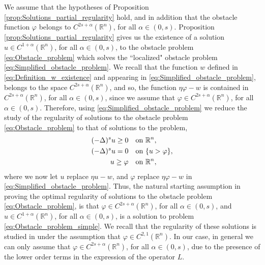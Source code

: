 \documentclass[11pt,reqno]{amsart}
\theoremstyle{definition}
\theoremstyle{remark}
\begin{document}
We assume that the hypotheses of Proposition \ref{prop:Solutions_partial_regularity} hold, and in addition that the obstacle function $\varphi$ belongs to $C^{2s+\alpha}({\mathbb{R}}^n)$, for all $\alpha\in (0,s)$. Proposition \ref{prop:Solutions_partial_regularity} gives us the existence of a solution $u\in C^{1+\alpha}({\mathbb{R}}^n)$, for all $\alpha\in (0,s)$, to the obstacle problem \eqref{eq:Obstacle_problem} which solves the ``localized" obstacle problem \eqref{eq:Simplified_obstacle_problem}. We recall that the function $w$ defined in \eqref{eq:Definition_w_existence} and appearing in \eqref{eq:Simplified_obstacle_problem}, belongs to the space $C^{2s+\alpha}({\mathbb{R}}^n)$, and so, the function $\eta \varphi-w$ is contained in $C^{2s+\alpha}({\mathbb{R}}^n)$, for all $\alpha \in (0,s)$, since we assume that $\varphi \in C^{2s+\alpha}({\mathbb{R}}^n)$, for all $\alpha \in (0,s)$. Therefore, using \eqref{eq:Simplified_obstacle_problem} we reduce the study of the regularity of solutions to the obstacle problem \eqref{eq:Obstacle_problem} to that of solutions to the problem,
\begin{equation}
\label{eq:Obstacle_problem_simple}
\begin{aligned}
(-\Delta)^s  u \geq 0&\quad\hbox{on }{\mathbb{R}}^n,\\
(-\Delta)^s u = 0&\quad\hbox{on } \{u>\varphi\},\\
 u\geq \varphi &\quad\hbox{on }{\mathbb{R}}^n,
\end{aligned}
\end{equation}
where we now let $u$ replace $\eta u-w$, and $\varphi$ replace $\eta\varphi-w$ in \eqref{eq:Simplified_obstacle_problem}. Thus, the natural starting assumption in proving the optimal regularity of solutions to the obstacle problem \eqref{eq:Obstacle_problem}, is that $\varphi\in C^{2s+\alpha}({\mathbb{R}}^n)$, for all $\alpha\in (0,s)$, and $u \in C^{1+\alpha}({\mathbb{R}}^n)$, for all $\alpha\in (0,s)$,  is a solution to problem \eqref{eq:Obstacle_problem_simple}. We recall that the regularity of these solutions is studied in \cite{Caffarelli_Salsa_Silvestre_2008} under the assumption that $\varphi \in C^{2,1}({\mathbb{R}}^n)$. In our case, in general we can only assume that $\varphi\in C^{2s+\alpha}({\mathbb{R}}^n)$, for all $\alpha\in (0,s)$, due to the presence of the lower order terms in the expression of the operator $L$. 
\end{document}

